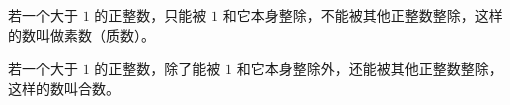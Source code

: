 \begin{definition}
	若一个大于 $1$ 的正整数，只能被 $1$ 和它本身整除，不能被其他正整数整除，这样的数叫做素数（质数）。
\end{definition}

\begin{definition}
	若一个大于 $1$ 的正整数，除了能被 $1$ 和它本身整除外，还能被其他正整数整除，这样的数叫合数。
\end{definition}


